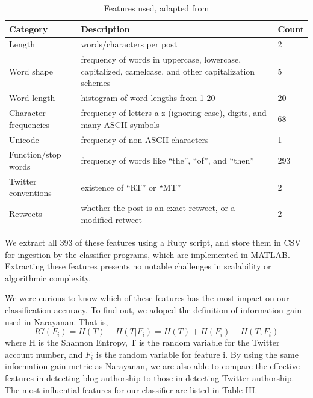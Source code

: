\documentclass[10pt, conference, compsocconf]{IEEEtran}
\begin{document}
\begin{table}[h]
  \centering
  \begin{tabularx}{\linewidth}{l X l}
    \toprule
    \bf{Category} & \bf{Description} & \bf{Count} \\ \midrule
    Length & words/characters per post & 2 \\ \midrule
    Word shape & frequency of words in uppercase, lowercase, capitalized, camelcase, and other capitalization schemes & 5 \\ \midrule
    Word length & histogram of word lengths from 1-20 & 20 \\ \midrule
    Character frequencies & frequency of letters a-z (ignoring case), digits, and many ASCII symbols & 68 \\ \midrule
    Unicode & frequency of non-ASCII characters & 1 \\ \midrule
    Function/stop words & frequency of words like ``the'', ``of'', and ``then'' & 293 \\ \midrule
    Twitter conventions & existence of ``RT'' or ``MT'' & 2 \\ \midrule
    Retweets & whether the post is an exact retweet, or a modified retweet & 2 \\
    \bottomrule
  \end{tabularx}
  \caption{Features used, adapted from \cite{Narayanan}}
\end{table}
We extract all 393 of these features using a Ruby script, and store
them in CSV for ingestion by the classifier programs, which are
implemented in MATLAB. Extracting these features presents no notable
challenges in scalability or algorithmic complexity.

We were curious to know which of these features has the most impact on
our classification accuracy. To find out, we adoped the definition of
information gain used in Narayanan. That is,
$$IG(F_{i}) = H(T) - H(T|F_{i}) = H(T) + H(F_{i}) - H(T, F_{i})$$
where H is the Shannon Entropy, T is the random variable for the
Twitter account number, and $F_{i}$ is the random variable for feature
i\cite{Narayanan}. By using the same information gain metric as
Narayanan, we are also able to compare the effective features in
detecting blog authorship to those in detecting Twitter
authorship. The most influential features for our classifier are listed
in Table III.
\end{document}
